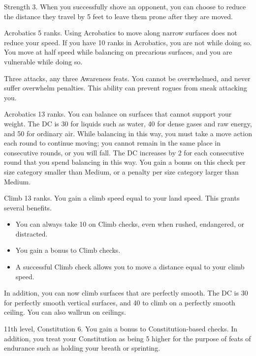 \featpres Strength 3.
\featben When you successfully shove an opponent, you can choose to reduce the distance they travel by 5 feet to leave them prone after they are moved.

\featpre Acrobatics 5 ranks.
\featben Using Acrobatics to move along narrow surfaces does not reduce your speed.
If you have 10 ranks in Acrobatics, you are not \vulnerable while doing so.
You move at half speed while balancing on precarious surfaces, and you are vulnerable while doing so.

\featpre Three attacks, any three Awareness feats.
\featben You cannot be overwhelmed, and never suffer overwhelm penalties.
This ability can prevent rogues from sneak attacking you.

\featpre Acrobatics 13 ranks.
\featben You can balance on surfaces that cannot support your weight.
The DC is 30 for liquids such as water, 40 for dense gases and raw energy, and 50 for ordinary air.
While balancing in this way, you must take a move action each round to continue moving; you cannot remain in the same place in consecutive rounds, or you will fall.
The DC increases by 2 for each consecutive round that you spend balancing in this way.
You gain a  bonus on this check per size category smaller than Medium, or a  penalty per size category larger than Medium.

\featpre Climb 13 ranks.
\featben You gain a climb speed equal to your land speed.
This grants several benefits.
\begin{itemize}
    \item You can always take 10 on Climb checks, even when rushed, endangered, or distracted.
    \item You gain a  bonus to Climb checks.
    \item A successful Climb check allows you to move a distance equal to your climb speed.
\end{itemize}

In addition, you can now climb surfaces that are perfectly smooth.
The DC is 30 for perfectly smooth vertical surfaces, and 40 to climb on a perfectly smooth ceiling.
You can also wallrun on ceilings.

\featpre 11th level, Constitution 6.
\featben You gain a  bonus to Constitution-based checks.
In addition, you treat your Constitution as being 5 higher for the purpose of feats of endurance such as holding your breath or sprinting.

